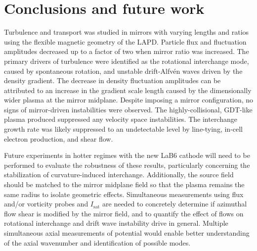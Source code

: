 \section{\label{sec:conclusion}Conclusions and future work}

Turbulence and transport was studied in mirrors with varying lengths and ratios using the flexible magnetic geometry of the LAPD. Particle flux and fluctuation amplitudes decreased up to a factor of two when mirror ratio was increased. The primary drivers of turbulence were identified as the rotational interchange mode, caused by spontaneous rotation, and unstable drift-Alfvén waves driven by the density gradient. The decrease in density fluctuation amplitudes can be attributed to an increase in the gradient scale length caused by the dimensionally wider plasma at the mirror midplane. Despite imposing a mirror configuration, no signs of mirror-driven instabilities were observed. The highly-collisional, GDT-like plasma produced suppressed any velocity space instabilities. The interchange growth rate was likely suppressed to an undetectable level by line-tying, in-cell electron production, and shear flow.

Future experiments in hotter regimes with the new LaB6 cathode \cite{LAPD_LaB6} will need to be performed to evaluate the robustness of these results, particularly concerning the stabilization of curvature-induced interchange. Additionally, the source field should be matched to the mirror midplane field so that the plasma remains the same radius to isolate geometric effects.
Simultaneous measurements using flux and/or vorticity probes and $I_\text{sat}$ are needed to concretely determine if azimuthal flow shear is modified by the mirror field, and to quantify the effect of flows on rotational interchange and drift wave instability drive in general.
Multiple simultaneous axial measurements of potential would enable better understanding of the axial wavenumber and identification of possible modes.

%
%


